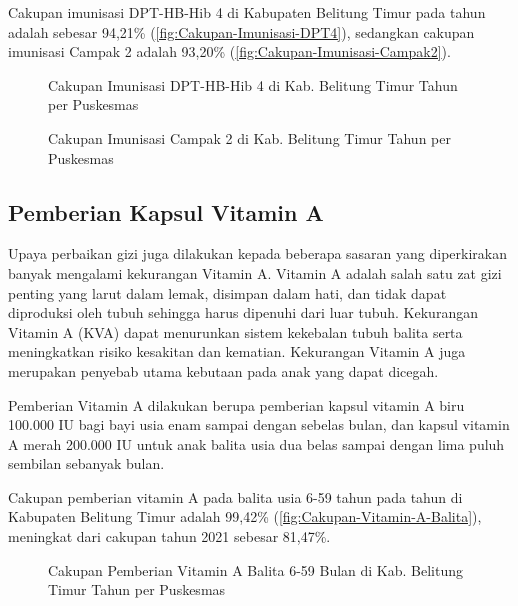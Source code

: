 Cakupan imunisasi DPT-HB-Hib 4 di Kabupaten Belitung Timur pada tahun \tP
adalah sebesar 94,21\% (\autoref{fig:Cakupan-Imunisasi-DPT4}), sedangkan cakupan imunisasi Campak 2 adalah 93,20\% (\autoref{fig:Cakupan-Imunisasi-Campak2}).

\begin{figure}[H]
    \centering
    \caption{Cakupan Imunisasi DPT-HB-Hib 4 di Kab. Belitung Timur Tahun \tP per Puskesmas}
    \label{fig:Cakupan-Imunisasi-DPT4}
\end{figure}

\begin{figure}[H]
    \centering
    \caption{Cakupan Imunisasi Campak 2 di Kab. Belitung Timur Tahun \tP per Puskesmas}
    \label{fig:Cakupan-Imunisasi-Campak2}
\end{figure}

\subsection{Pemberian Kapsul Vitamin A}
Upaya perbaikan gizi juga dilakukan kepada beberapa sasaran yang diperkirakan
banyak mengalami kekurangan Vitamin A. Vitamin A adalah salah satu
zat gizi penting yang larut dalam lemak, disimpan dalam hati, dan
tidak dapat diproduksi oleh tubuh sehingga harus dipenuhi dari luar
tubuh. Kekurangan Vitamin A (KVA) dapat menurunkan sistem kekebalan
tubuh balita serta meningkatkan risiko kesakitan dan kematian. Kekurangan
Vitamin A juga merupakan penyebab utama kebutaan pada anak yang dapat
dicegah.

Pemberian Vitamin A dilakukan berupa pemberian kapsul vitamin A biru 100.000 IU bagi bayi
usia enam sampai dengan sebelas bulan, dan kapsul vitamin A merah 200.000
IU untuk anak balita usia dua belas sampai dengan lima puluh sembilan sebanyak
bulan.

Cakupan pemberian vitamin A pada balita usia 6-59 tahun pada tahun \tP di Kabupaten Belitung Timur adalah 99,42\% (\autoref{fig:Cakupan-Vitamin-A-Balita}), meningkat dari cakupan tahun 2021 sebesar 81,47\%.

\begin{figure}[H]
    \centering
    \caption{Cakupan Pemberian Vitamin A Balita 6-59 Bulan di Kab. Belitung Timur Tahun \tP per Puskesmas}
    \label{fig:Cakupan-Vitamin-A-Balita}
\end{figure}


